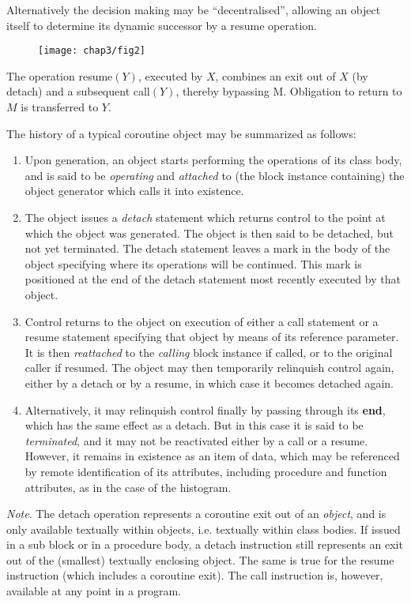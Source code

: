 \noindent
Alternatively the decision making may be ``decentralised'', allowing an object itself to determine its dynamic successor by a resume operation.

\begin{figure}[h]
	\centering
	\texttt{[image: chap3/fig2]}
\end{figure}

The operation resume$(Y)$, executed by $X$, combines an exit out of $X$ (by detach) and a subsequent call$(Y)$, thereby bypassing M. Obligation to 	return to $M$ is transferred to $Y$.

The history of a typical coroutine object may be summarized as follows:

\begin{enumerate}[wide, nosep, label=(\arabic*)]
	\item Upon generation, an object starts performing the operations of its class body, and is said to be \textit{operating} and \textit{attached} to (the block instance containing) the object generator which calls it into existence.
	\item The object issues a \textit{detach} statement which returns control to the point at which the object was generated. The object is then said to be detached, but not yet terminated. The detach statement leaves a mark in the body of the object specifying where its operations will be continued. This mark is positioned at the end of the detach statement most recently executed by that object.
	\item Control returns to the object on execution of either a call statement or a resume statement specifying that object by means of its reference parameter. It is then \textit{reattached} to the \textit{calling} block instance if called, or to the original caller if resumed. The object may then temporarily relinquish control again, either by a detach or by a resume, in which case it becomes detached again. 
	\item Alternatively, it may relinquish control finally by passing through its \textbf{end}, which has the same effect as a detach. But in this case it is said to be \textit{terminated}, and it may not be reactivated either by a call or a resume. However, it remains in existence as an item of data, which may be referenced by remote identification of its attributes, including procedure and function attributes, as in the case of the histogram.
\end{enumerate}

\textit{Note}. The detach operation represents a coroutine exit out of an \textit{object}, and is only available textually within objects, i.e. textually within class bodies. If issued in a sub block or in a procedure body, a detach instruction still represents an exit out of the (smallest) textually enclosing object. The same
is true for the resume instruction (which includes a coroutine exit). The call instruction is, however, available at any point in a program.

